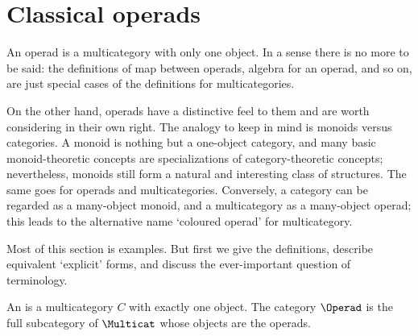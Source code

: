 \section{Classical operads}
%
%
%

An operad is a multicategory with only one object.  In a sense there is no
more to be said: the definitions of map between operads, algebra
for an operad, and so on, are just special cases of the definitions for
multicategories.  

On the other hand, operads have a distinctive feel to them and are worth
considering in their own right.  The analogy to keep in mind is monoids
versus categories.  A monoid is nothing but a one-object category, and many
basic monoid-theoretic concepts are specializations of category-theoretic
concepts; nevertheless, monoids still form a natural and interesting class
of structures.  The same goes for operads and multicategories.  Conversely,
a category can be regarded as a many-object monoid, and a multicategory as
a many-object operad; this leads to the alternative name `coloured operad'
for multicategory.

Most of this section is examples.  But first we give the definitions,
describe equivalent `explicit' forms, and discuss the ever-important
question of terminology.

\begin{defn}	
An  is a multicategory $C$ with exactly one object.  The
category $\Operad$%
% 
% 
is the full subcategory of $\Multicat$ whose objects are
the operads.
\end{defn}

